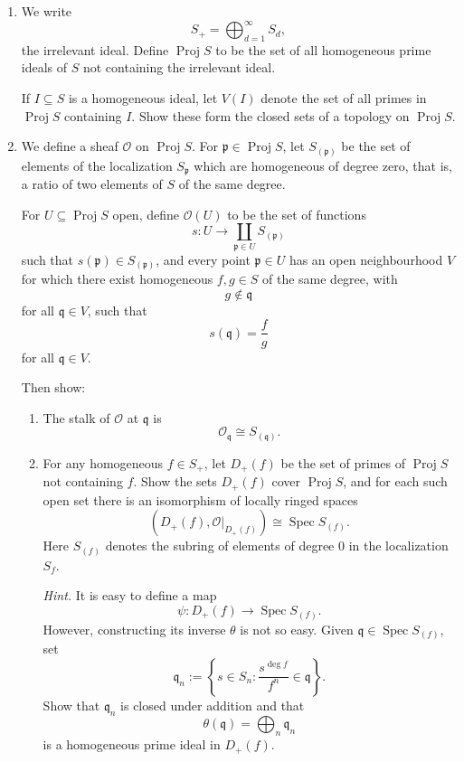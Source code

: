 \documentclass[12pt,a4paper]{article}
\DeclareMathOperator{\Spec}{Spec}
\DeclareMathOperator{\Proj}{Proj}
\theoremstyle{notespace}
\begin{document}
\begin{enumerate}
	\item[(i)]
	We write
	\[
	S_+ = \bigoplus_{d=1}^{\infty} S_d,
	\]
	the irrelevant ideal. Define \(\Proj S\) to be the set of all homogeneous prime ideals
	of \(S\) not containing the irrelevant ideal.
	
	If \(I\subseteq S\) is a homogeneous ideal, let \(V(I)\) denote the set of all primes
	in \(\Proj S\) containing \(I\). Show these form the closed sets of a topology on
	\(\Proj S\).
	
	\item[(ii)]
	We define a sheaf \(\mathcal O\) on \(\Proj S\). For \(\mathfrak p\in \Proj S\), let
	\(S_{(\mathfrak p)}\) be the set of elements of the localization \(S_{\mathfrak p}\)
	which are homogeneous of degree zero, that is, a ratio of two elements of \(S\) of
	the same degree.
	
	For \(U\subseteq \Proj S\) open, define \(\mathcal O(U)\) to be the set of functions
	\[
	s:U\longrightarrow \coprod_{\mathfrak p\in U} S_{(\mathfrak p)}
	\]
	such that \(s(\mathfrak p)\in S_{(\mathfrak p)}\), and every point
	\(\mathfrak p\in U\) has an open neighbourhood \(V\) for which there exist
	homogeneous \(f,g\in S\) of the same degree, with
	\[
	g\notin \mathfrak q
	\]
	for all \(\mathfrak q\in V\), such that
	\[
	s(\mathfrak q)=\frac{f}{g}
	\]
	for all \(\mathfrak q\in V\).
	
	Then show:
	
	\begin{enumerate}
		\item[(a)]
		The stalk of \(\mathcal O\) at \(\mathfrak q\) is
		\[
		\mathcal O_{\mathfrak q}\cong S_{(\mathfrak q)}.
		\]
		
		\item[(b)]
		For any homogeneous \(f\in S_+\), let \(D_+(f)\) be the set of primes of
		\(\Proj S\) not containing \(f\). Show the sets \(D_+(f)\) cover \(\Proj S\),
		and for each such open set there is an isomorphism of locally ringed spaces
		\[
		\left(D_+(f),\mathcal O|_{D_+(f)}\right)
		\cong
		\Spec S_{(f)}.
		\]
		Here \(S_{(f)}\) denotes the subring of elements of degree \(0\) in the localization
		\(S_f\).
		
		\emph{Hint.} It is easy to define a map
		\[
		\psi:D_+(f)\longrightarrow \Spec S_{(f)}.
		\]
		However, constructing its inverse \(\theta\) is not so easy. Given
		\(\mathfrak q\in \Spec S_{(f)}\), set
		\[
		\mathfrak q_n
		:=
		\left\{
		s\in S_n :
		\frac{s^{\deg f}}{f^n}\in \mathfrak q
		\right\}.
		\]
		Show that \(\mathfrak q_n\) is closed under addition and that
		\[
		\theta(\mathfrak q)
		=
		\bigoplus_n \mathfrak q_n
		\]
		is a homogeneous prime ideal in \(D_+(f)\).
		

\end{enumerate}
\end{enumerate}
\end{document}
